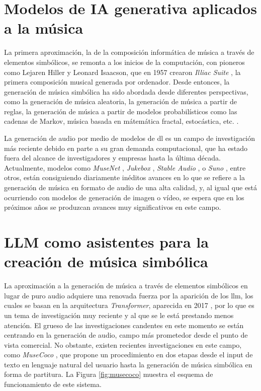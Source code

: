 \section{Modelos de IA generativa aplicados a la música}

La primera aproximación, la de la composición informática de música a través de elementos simbólicos, se remonta a los inicios de la computación, con pioneros como Lejaren Hiller y Leonard Isaacson, que en 1957 crearon \textit{Illiac Suite} \citep{arizaTwoPioneeringProjects2011,funkMusicalSuiteComposed2018}, la primera composición musical generada por ordenador. Desde entonces, la generación de música simbólica ha sido abordada desde diferentes perspectivas, como la generación de música aleatoria, la generación de música a partir de reglas, la generación de música a partir de modelos probabilísticos como las cadenas de Markov, música basada en mátemática fractal, estocástica, etc. \citep{hernandez-olivanSurveyArtificialIntelligence2022}. 

La generación de audio por medio de modelos de \gls{dl} es un campo de investigación más reciente debido en parte a su gran demanda computacional, que ha estado fuera del alcance de investigadores y empresas hasta la última década. Actualmente, modelos como \textit{MuseNet}  \citep{departmentofcomputersciencesrminstituteofscienceandtechnologychennaiindia.MusenetMusicGeneration2020a}, \textit{Jukebox} \citep{dhariwalJukeboxGenerativeModel2020}, \textit{Stable Audio} \cite{StableAudioFast}, o \textit{Suno} \citep{SunoAI}, entre otros, están consiguiendo diariamente inéditos avances en lo que se refiere a la generación de música en formato de audio de una alta calidad, y, al igual que está ocurriendo con modelos de generación de imagen o vídeo, se espera que en los próximos años se produzcan avances muy significativos en este campo.


\section{LLM como asistentes para la creación de música simbólica}
\label{sec:llm_asistentes_creacion_codigo_programacion}

La aproximación a la generación de música a través de elementos simbólicos en lugar de puro audio adquiere una renovada fuerza por la aparición de los \gls{llm}, los cuales se basan en la arquitectura \textit{Transformer}, aparecida en 2017 \citep{vaswaniAttentionAllYou2017}, por lo que es un tema de investigación muy reciente y al que se le está prestando menos atención. El grueso de las investigaciones candentes en este momento se están centrando en la generación de audio, campo más prometedor desde el punto de vista comercial. No obstante, existen recientes investigaciones en este campo, como \textit{MuseCoco} \citep{luMuseCocoGeneratingSymbolic2023}, que propone un procedimiento en dos etapas desde el input de texto en lenguaje natural del usuario hasta la generación de música simbólica en forma de partitura. La Figura \ref{fig:musecoco} muestra el esquema de funcionamiento de este sistema. 

